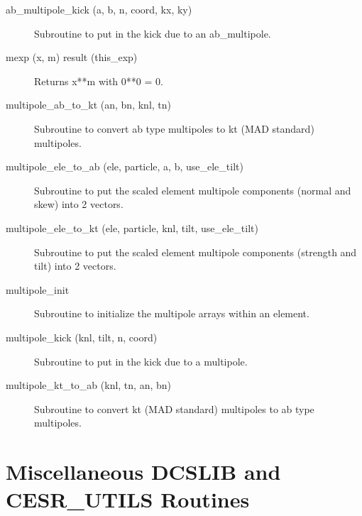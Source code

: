 \begin{description}

\item[ab_multipole_kick (a, b, n, coord, kx, ky)] \Newline 
Subroutine to put in the kick due to an ab_multipole.

\item[mexp (x, m) result (this_exp)] \Newline 
Returns x**m with 0**0 = 0.

\item[multipole_ab_to_kt (an, bn, knl, tn)] \Newline
Subroutine to convert ab type multipoles to kt (MAD standard) multipoles. 

\item[multipole_ele_to_ab (ele, particle, a, b, use_ele_tilt)] \Newline
Subroutine to put the scaled element multipole components (normal and skew) into 2 vectors. 

\item[multipole_ele_to_kt (ele, particle, knl, tilt, use_ele_tilt)] \Newline
Subroutine to put the scaled element multipole components (strength and tilt) 
into 2 vectors. 

\item[multipole_init] \Newline
Subroutine to initialize the multipole arrays within an element.

\item[multipole_kick (knl, tilt, n, coord)] \Newline
Subroutine to put in the kick due to a multipole. 

\item[multipole_kt_to_ab (knl, tn, an, bn)] \Newline
Subroutine to convert kt (MAD standard) multipoles to ab type multipoles. 

\end{description}

\section{Miscellaneous DCSLIB and CESR_UTILS Routines}
\label{r:dcs.misc}      


